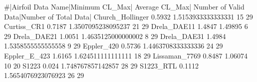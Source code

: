 #|Airfoil Data Name|Minimum CL_Max| Average CL_Max| Number of Valid Data|Number of Total Data|
Church_Hollinger    0.5932  1.5153933333333331  15  29
Curtiss_CR1         0.7187  1.3507095238095237  21  29
Drela_DAE11         1.4847  1.49895             6   29
Drela_DAE21         1.0051  1.4635125000000002  8   29
Drela_DAE31         1.4984  1.5358555555555558  9   29
Eppler_420          0.5736  1.4463708333333336  24  29
Eppler_E_423        1.6165  1.624511111111111   18  29
Lissaman_7769       0.8487  1.06074             10  20
S1223               0.024   1.748767857142857   28  29
S1223_RTL           0.1112  1.5654076923076923  26  29

